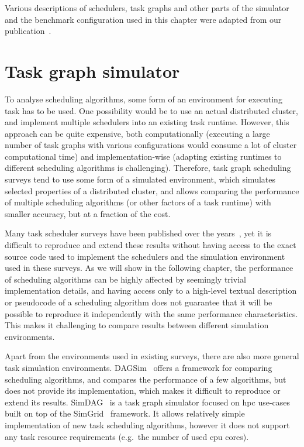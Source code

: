 Various descriptions of schedulers, task graphs and other parts of the simulator and the benchmark
configuration used in this chapter were adapted from our publication~\cite{estee}.


\section{Task graph simulator}
\label{sec:estee-simulator}
To analyse scheduling algorithms, some form of an environment for executing task has to be used.
One possibility would be to use an actual distributed cluster, and implement multiple schedulers
into an existing task runtime. However, this approach can be quite expensive, both computationally
(executing a large number of task graphs with various configurations would consume a lot of cluster
computational time) and implementation-wise (adapting existing runtimes to different scheduling
algorithms is challenging). Therefore, task graph scheduling surveys tend to use some form of a
simulated environment, which simulates selected properties of a distributed cluster, and allows
comparing the performance of multiple scheduling algorithms (or other factors of a task runtime)
with smaller accuracy, but at a fraction of the  cost.

Many task scheduler surveys have been published over the years~\cite{hlfet1974, kwok1998benchmarking, hagras2003static, sinnen2005, wang2018list}, yet it is
difficult to reproduce and extend these results without having access to the exact source code used
to implement the schedulers and the simulation environment used in these surveys. As we will show
in the following chapter, the performance of scheduling algorithms can be highly affected by
seemingly trivial implementation details, and having access only to a high-level textual
description or pseudocode of a scheduling algorithm does not guarantee that it will be possible to
reproduce it independently with the same performance characteristics. This makes it challenging to
compare results between different simulation environments.

Apart from the environments used in existing surveys, there are also more general task simulation
environments. DAGSim~\cite{dagsim} offers a framework for comparing scheduling
algorithms, and compares the performance of a few algorithms, but does not provide its
implementation, which makes it difficult to reproduce or extend its results.
SimDAG~\cite{simdag} is a task graph simulator focused on \gls{hpc}
use-cases built on top of the SimGrid~\cite{simgrid} framework. It allows relatively
simple implementation of new task scheduling algorithms, however it does not support any task
resource requirements (e.g.\ the number of used \gls{cpu} cores).


